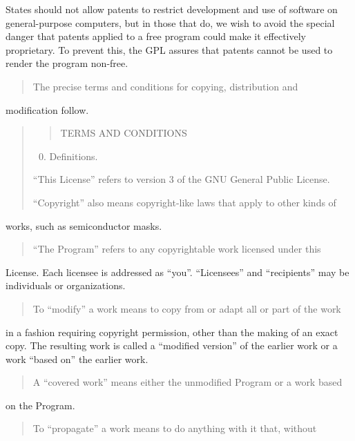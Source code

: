 \documentclass[letterpaper,10pt,english]{sphinxmanual}
\begin{document}
States should not allow patents to restrict development and use of
software on general-purpose computers, but in those that do, we wish to
avoid the special danger that patents applied to a free program could
make it effectively proprietary.  To prevent this, the GPL assures that
patents cannot be used to render the program non-free.
\begin{quote}

The precise terms and conditions for copying, distribution and
\end{quote}

modification follow.
\begin{quote}
\begin{quote}

TERMS AND CONDITIONS
\end{quote}
\begin{enumerate}
\setcounter{enumi}{-1}
\item {} 
Definitions.

\end{enumerate}

“This License” refers to version 3 of the GNU General Public License.

“Copyright” also means copyright-like laws that apply to other kinds of
\end{quote}

works, such as semiconductor masks.
\begin{quote}

“The Program” refers to any copyrightable work licensed under this
\end{quote}

License.  Each licensee is addressed as “you”.  “Licensees” and
“recipients” may be individuals or organizations.
\begin{quote}

To “modify” a work means to copy from or adapt all or part of the work
\end{quote}

in a fashion requiring copyright permission, other than the making of an
exact copy.  The resulting work is called a “modified version” of the
earlier work or a work “based on” the earlier work.
\begin{quote}

A “covered work” means either the unmodified Program or a work based
\end{quote}

on the Program.
\begin{quote}

To “propagate” a work means to do anything with it that, without
\end{quote}
\end{document}
